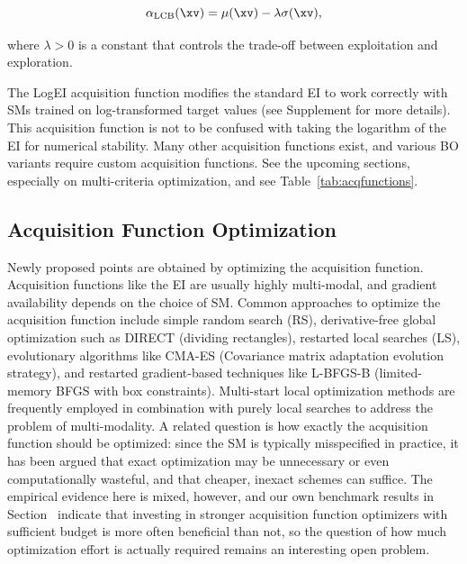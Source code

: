 \documentclass[12pt,letterpaper]{article}
\begin{document}
\begin{displaymath}
\alpha_{\operatorname{LCB}}(\xv) = \mu{}(\xv) - \lambda \sigma(\xv),
\end{displaymath}

where $\lambda > 0$ is a constant that controls the trade-off between exploitation and exploration.

The LogEI acquisition function\cite{hutter2009,watanabe2024} modifies the standard EI to work correctly with SMs trained on log-transformed target values (see Supplement  for more details).
This acquisition function is not to be confused with taking the logarithm of the EI for numerical stability\cite{ament2023}.
Many other acquisition functions exist, and various BO variants require custom acquisition functions. 
See the upcoming sections, especially on multi-criteria optimization, and see Table~\ref{tab:acqfunctions}.

\subsection*{Acquisition Function Optimization}

\label{sec:acquisition-optimizer}
Newly proposed points are obtained by optimizing the acquisition function.
Acquisition functions like the EI are usually highly multi-modal\cite{garnett2023}, and gradient availability depends on the choice of SM. 
Common approaches to optimize the acquisition function include simple random search (RS), derivative-free global optimization such as DIRECT (dividing rectangles)\cite{jones1993}, restarted local searches (LS)\cite{hutter2011}, evolutionary algorithms like CMA-ES (Covariance matrix adaptation evolution strategy)\cite{hansen2001}, and restarted gradient-based techniques like L-BFGS-B (limited-memory BFGS with box constraints)\cite{byrd1995}.
Multi-start local optimization methods are frequently employed in combination with purely local searches to address the problem of multi-modality\cite{snoek2012,balandat2020,kim2021}.
A related question is how exactly the acquisition function should be optimized: since the SM is typically misspecified in practice, it has been argued that exact optimization may be unnecessary or even computationally wasteful, and that cheaper, inexact schemes can suffice\cite{ahmed2016}.
The empirical evidence here is mixed, however, and our own benchmark results in Section~ indicate that investing in stronger acquisition function optimizers with sufficient budget is more often beneficial than not, so the question of how much optimization effort is actually required remains an interesting open problem.
\end{document}
